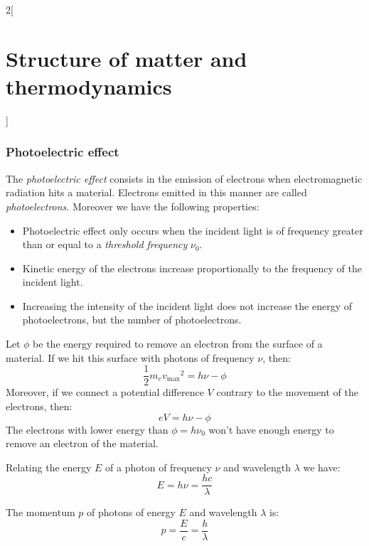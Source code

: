 \documentclass[../../../main_physics.tex]{subfiles}
\begin{document}
\begin{multicols}{2}[\section{Structure of matter and thermodynamics}]
\begin{proposition}
  \end{proposition}
  \begin{center}
    \begin{minipage}{\linewidth}
      \centering
      
    \end{minipage}
  \end{center}
  \subsubsection{Photoelectric effect}
  \begin{definition}
    The \emph{photoelectric effect} consists in the emission of electrons when electromagnetic radiation hits a material. Electrons emitted in this manner are called \emph{photoelectrons}. Moreover we have the following properties:
    \begin{itemize}
      \item Photoelectric effect only occurs when the incident light is of frequency greater than or equal to a \emph{threshold frequency} $\nu_0$.
      \item Kinetic energy of the electrons increase proportionally to the frequency of the incident light.
      \item Increasing the intensity of the incident light does not increase the energy of photoelectrons, but the number of photoelectrons.
    \end{itemize}
  \end{definition}
  \begin{proposition}
    Let $\phi$ be the energy required to remove an electron from the surface of a material. If we hit this surface with photons of frequency $\nu$, then: $$\frac{1}{2}m_e{v_\text{max}}^2=h\nu-\phi$$ Moreover, if we connect a potential difference $V$ contrary to the movement of the electrons, then: $$eV=h\nu-\phi$$ The electrons with lower energy than $\phi=h\nu_0$ won't have enough energy to remove an electron of the material.
  \end{proposition}
  \begin{proposition}
    Relating the energy $E$ of a photon of frequency $\nu$ and wavelength $\lambda$ we have: $$E=h\nu=\frac{hc}{\lambda}$$
  \end{proposition}
  \begin{proposition}
    The momentum $p$ of photons of energy $E$ and wavelength $\lambda$ is: $$p=\frac{E}{c}=\frac{h}{\lambda}$$
  \end{proposition}

\end{multicols}
\end{document}
